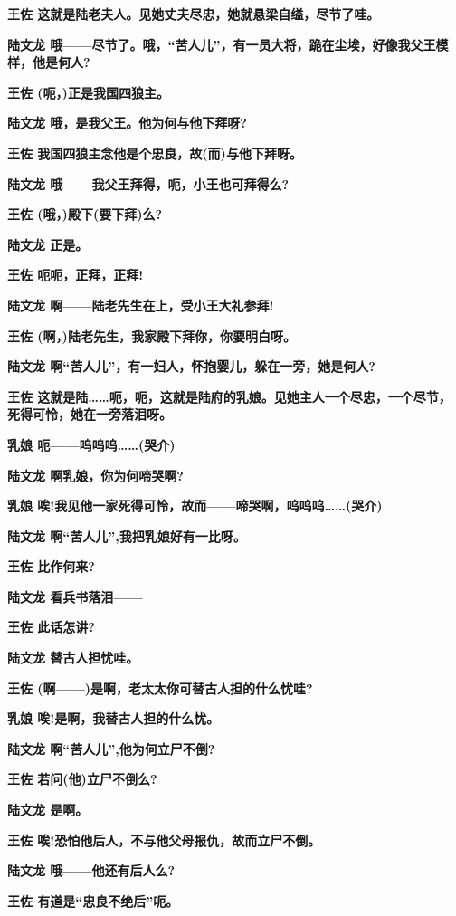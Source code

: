\textbf{王佐 这就是陆老夫人。见她丈夫尽忠，她就悬梁自缢，尽节了哇。}

\textbf{陆文龙
哦------尽节了。哦，``苦人儿''，有一员大将，跪在尘埃，好像我父王模样，他是何人?}

\textbf{王佐 (呃，)正是我国四狼主。}

\textbf{陆文龙 哦，是我父王。他为何与他下拜呀?}

\textbf{王佐 我国四狼主念他是个忠良，故(而)与他下拜呀。}

\textbf{陆文龙 哦------我父王拜得，呃，小王也可拜得么?}

\textbf{王佐 (哦，)殿下(要下拜)么?}

\textbf{陆文龙 正是。}

\textbf{王佐 呃呃，正拜，正拜!}

\textbf{陆文龙 啊------陆老先生在上，受小王大礼参拜!}

\textbf{王佐 (啊，)陆老先生，我家殿下拜你，你要明白呀。}

\textbf{陆文龙 啊``苦人儿''，有一妇人，怀抱婴儿，躲在一旁，她是何人?}

\textbf{王佐
这就是陆\ldots{}\ldots{}呃，呃，这就是陆府的乳娘。见她主人一个尽忠，一个尽节，死得可怜，她在一旁落泪呀。}

\textbf{乳娘 呃------呜呜呜\ldots{}\ldots{}(哭介)}

\textbf{陆文龙 啊乳娘，你为何啼哭啊?}

\textbf{乳娘
唉!我见他一家死得可怜，故而------啼哭啊，呜呜呜\ldots{}\ldots{}(哭介)}

\textbf{陆文龙 啊``苦人儿'',我把乳娘好有一比呀。}

\textbf{王佐 比作何来?}

\textbf{陆文龙 看兵书落泪------}

\textbf{王佐 此话怎讲?}

\textbf{陆文龙 替古人担忧哇。}

\textbf{王佐 (啊------)是啊，老太太你可替古人担的什么忧哇?}

\textbf{乳娘 唉!是啊，我替古人担的什么忧。}

\textbf{陆文龙 啊``苦人儿'',他为何立尸不倒?}

\textbf{王佐 若问(他)立尸不倒么?}

\textbf{陆文龙 是啊。}

\textbf{王佐 唉!恐怕他后人，不与他父母报仇，故而立尸不倒。}

\textbf{陆文龙 哦------他还有后人么?}

\textbf{王佐 有道是``忠良不绝后''呃。}

